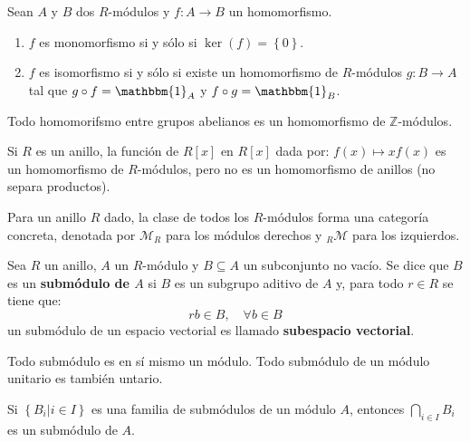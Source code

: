 \documentclass[12pt]{report}
\newcounter{it}
\theoremstyle{largebreak}
\newcommand\cf[3]{\ensuremath{#1:#2\rightarrow#3}}
\newcommand{\bbm}[1]{\mathbbm{#1}}
\begin{document}
    \begin{theor}
        Sean $A$ y $B$ dos $R$-módulos y $\cf{f}{A}{B}$ un homomorfismo.
        \begin{enumerate}[label = \textit{(\alph*)}]
            \item $f$ es monomorfismo si y sólo si $\ker(f)=\left\{0 \right\}$.
            \item $f$ es isomorfismo si y sólo si existe un homomorfismo de $R$-módulos $\cf{g}{B}{A}$ tal que $g\circ f = \bbm{1}_A$ y $f\circ g=\bbm{1}_B$.
        \end{enumerate}
    \end{theor}

    \begin{exa}
        Todo homomorifsmo entre grupos abelianos es un homomorfismo de $\mathbb{Z}$-módulos.
    \end{exa}

    \begin{exa}
        Si $R$ es un anillo, la función de $R[x]$ en $R[x]$ dada por: $f(x)\mapsto xf(x)$ es un homomorfismo de $R$-módulos, pero no es un homomorfismo de anillos (no separa productos).
    \end{exa}

    \begin{obs}
        Para un anillo $R$ dado, la clase de todos los $R$-módulos forma una categoría concreta, denotada por $\mathcal{M}_R$ para los módulos derechos y ${}_R\mathcal{M}$ para los izquierdos.
    \end{obs}

    \begin{mydef}
        Sea $R$ un anillo, $A$ un $R$-módulo y $B\subseteq A$ un subconjunto no vacío. Se dice que $B$ es un \textbf{submódulo de $A$} si $B$ es un subgrupo aditivo de $A$ y, para todo $r\in R$ se tiene que:
        \begin{equation*}
            rb\in B,\quad\forall b\in B
        \end{equation*}
        un submódulo de un espacio vectorial es llamado \textbf{subespacio vectorial}.
    \end{mydef}

    \begin{obs}
        Todo submódulo es en sí mismo un módulo. Todo submódulo de un módulo unitario es también untario.
    \end{obs}

    \begin{exa}
        Si $\left\{B_i\Big|i\in I \right\}$ es una familia de submódulos de un módulo $A$, entonces $\bigcap_{ i\in I}B_i$ es un submódulo de $A$.
    \end{exa}
\end{document}
